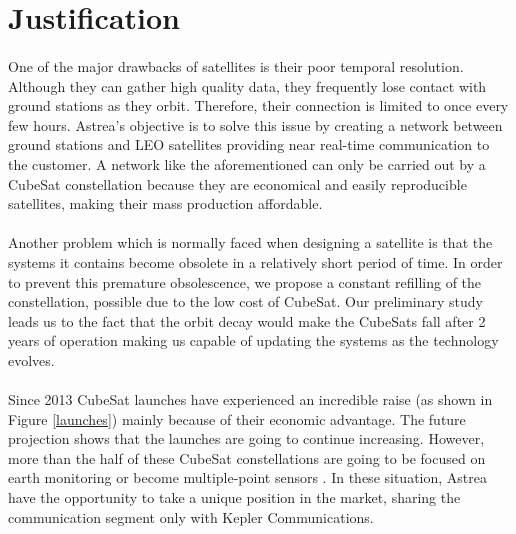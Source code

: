 \section{Justification}
\paragraph{}
One of the major drawbacks of satellites is their poor temporal resolution. Although they can gather high quality data, they frequently lose contact with ground stations as they orbit. Therefore, their connection is limited to once every few hours. Astrea’s objective is to solve this issue by creating a network between ground stations and LEO satellites providing near real-time communication to the customer. A network like the aforementioned can only be carried out by a CubeSat constellation because they are economical and easily reproducible satellites, making their mass production affordable.

\paragraph{}
Another problem which is normally faced when designing a satellite is that the systems it contains become obsolete in a relatively short period of time. In order to prevent this premature obsolescence, we propose a constant refilling of the constellation, possible due to the low cost of CubeSat. Our preliminary study leads us to the fact that the orbit decay would make the CubeSats fall after 2 years of operation making us capable of updating the systems as the technology evolves.

\paragraph{}
Since 2013 CubeSat launches have experienced an incredible raise (as shown in Figure \ref{launches}) mainly because of their economic advantage. The future projection shows that the launches are going to continue increasing. However, more than the half of these CubeSat constellations are going to be focused on earth monitoring or become multiple-point sensors \cite{SpaceWorks}. In these situation, Astrea have the opportunity to take a unique position in the market, sharing the communication segment only with Kepler Communications\cite{keppler}.

